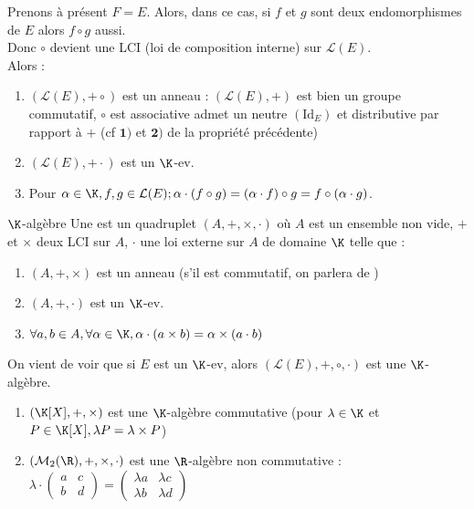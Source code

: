 \documentclass[12pt, a4paper]{report}
\begin{document}
\begin{remarque}{}
Prenons à présent $F=E$. Alors, dans ce cas, si $f$ et $g$ sont deux endomorphismes de $E$ alors $f \circ g$ aussi. \\
Donc $\circ$ devient une LCI (loi de composition interne) sur $\mathcal{L}(E)$. \\
Alors :
\begin{enumerate}
	\item $(\mathcal{L}(E), + \circ)$ est un anneau : $(\mathcal{L}(E), +)$ est bien un groupe commutatif, $\circ$ est associative admet un neutre $(\text{Id}_E)$ et distributive par rapport à $+$ (cf $\textbf{1)}$ et $\textbf{2)}$ de la propriété précédente)
	
	\item $(\mathcal{L}(E), + \cdot)$ est un $\K$-ev.
	
	\item Pour $\alpha \in \K, f,g \in \mathcal{L}(E); \alpha \cdot (f \circ g) = (\alpha \cdot f) \circ g  = f \circ (\alpha \cdot g)$.
\end{enumerate}

\begin{definition}{$\K$-algèbre}
Une  est un quadruplet $(A,+,\times, \cdot)$ où $A$ est un ensemble non vide, $+$ et $\times$ deux LCI sur $A$, $\cdot$ une loi externe sur $A$ de domaine $\K$ telle que :
\begin{enumerate}
	\item $(A,+,\times)$ est un anneau (s'il est commutatif, on parlera de )
	
	\item $(A,+,\cdot)$ est un $\K$-ev.
	
	\item $\forall a,b \in A, \forall \alpha \in \K, \alpha \cdot (a \times b) = \alpha \times (a \cdot b)$
\end{enumerate}
\end{definition}

On vient de voir que si $E$ est un $\K$-ev, alors $(\mathcal{L}(E), +, \circ, \cdot)$ est une $\K$-algèbre.

\begin{exemple}{}
\begin{enumerate}
	\item $(\K[X], +, \times)$ est une $\K$-algèbre commutative (pour $\lambda \in \K$ et $P \in \K[X], \lambda P = \lambda \times P$)
	
	\item $(\mathcal{M}_2(\R),+,\times, \cdot)$ est une $\R$-algèbre non commutative : $\lambda \cdot \begin{pmatrix} a & c \\ b & d \end{pmatrix} = \begin{pmatrix} \lambda a & \lambda c \\ \lambda b & \lambda d \end{pmatrix}$
	

\end{enumerate}
\end{exemple}
\end{remarque}
\end{document}
